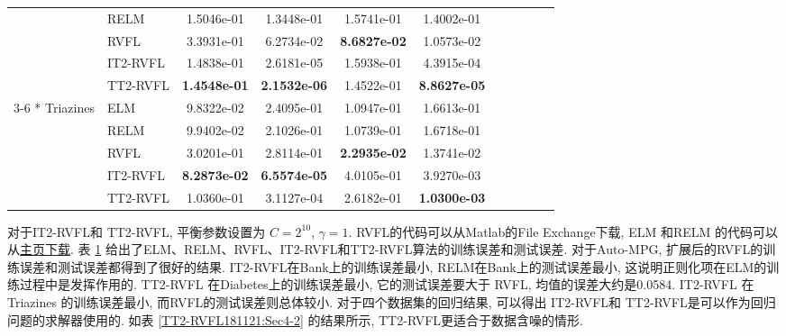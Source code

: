 \begin{table} [H]
\begin{center}
\begin{tabular} {llccccccccc}
&RELM   &1.5046e-01   &1.3448e-01   &1.5741e-01   &1.4002e-01 \\
&RVFL &3.3931e-01  & 6.2734e-02   &\textbf{8.6827e-02}  &  1.0573e-02\\
&IT2-RVFL&1.4838e-01  & 2.6181e-05  & 1.5938e-01  & 4.3915e-04\\
&TT2-RVFL&\textbf{1.4548e-01}  &  \textbf{2.1532e-06}   & 1.4522e-01  & \textbf{8.8627e-05} \\
\cline{3-6}
\multirow{5} {*} {Triazines} &ELM &9.8322e-02   &2.4095e-01   &1.0947e-01   &1.6613e-01   \\
&RELM    &9.9402e-02   &2.1026e-01   &1.0739e-01   &1.6718e-01\\
&RVFL &3.0201e-01 &  2.8114e-01  & \textbf{2.2935e-02}   & 1.3741e-02\\
&IT2-RVFL&\textbf{8.2873e-02}  &  \textbf{6.5574e-05}  &  4.0105e-01  & 3.9270e-03\\
&TT2-RVFL&1.0360e-01  & 3.1127e-04 &  2.6182e-01 &  \textbf{1.0300e-03} \\
\hline
\end{tabular}
\end{center}
\label{TT2-RVFL181116:Sec4-1}
\end{table}
对于IT2-RVFL和 TT2-RVFL, 平衡参数设置为 $C=2^{10}$, $\gamma =1$.
RVFL的代码可以从Matlab的File Exchange下载,  ELM 和RELM 的代码可以从\href{https://www.ntu.edu.sg/home/egbhuang/elm_random_hidden_nodes.html}{主页下载}.
表 \ref{TT2-RVFL181116:Sec4-1} 给出了ELM、RELM、RVFL、IT2-RVFL和TT2-RVFL算法的训练误差和测试误差.
对于Auto-MPG, 扩展后的RVFL的训练误差和测试误差都得到了很好的结果.
IT2-RVFL在Bank上的训练误差最小,  RELM在Bank上的测试误差最小, 这说明正则化项在ELM的训练过程中是发挥作用的.
TT2-RVFL 在Diabetes上的训练误差最小, 它的测试误差要大于 RVFL, 均值的误差大约是0.0584.
IT2-RVFL 在Triazines 的训练误差最小, 而RVFL的测试误差则总体较小.
对于四个数据集的回归结果, 可以得出 IT2-RVFL和 TT2-RVFL是可以作为回归问题的求解器使用的.
如表 \ref{TT2-RVFL181121:Sec4-2} 的结果所示, TT2-RVFL更适合于数据含噪的情形.
